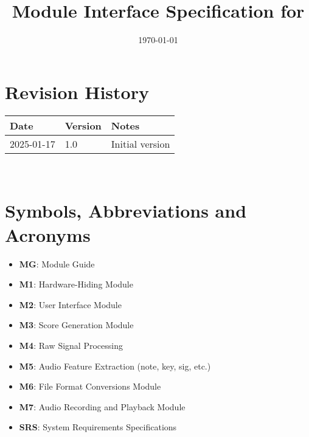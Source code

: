 \documentclass[12pt, titlepage]{article}
\begin{document}
\title{Module Interface Specification for \progname{}}

\author{\authname}

\date{\today}

\maketitle


\section{Revision History}

\begin{tabularx}{\textwidth}{p{3cm}p{2cm}X}
\toprule {\bf Date} & {\bf Version} & {\bf Notes}\\
\midrule
2025-01-17 & 1.0 & Initial version\\
\bottomrule
\end{tabularx}

~\newpage

\section{Symbols, Abbreviations and Acronyms}

\begin{itemize}
    \item \textbf{MG}: Module Guide
    \item \textbf{M1}: Hardware-Hiding Module
    \item \textbf{M2}: User Interface Module
    \item \textbf{M3}: Score Generation Module
    \item \textbf{M4}: Raw Signal Processing
    \item \textbf{M5}: Audio Feature Extraction (note, key, sig, etc.)
    \item \textbf{M6}: File Format Conversions Module
    \item \textbf{M7}: Audio Recording and Playback Module
    \item \textbf{SRS}: System Requirements Specifications
    
\end{itemize}

\newpage

\tableofcontents

\newpage

\end{document}
